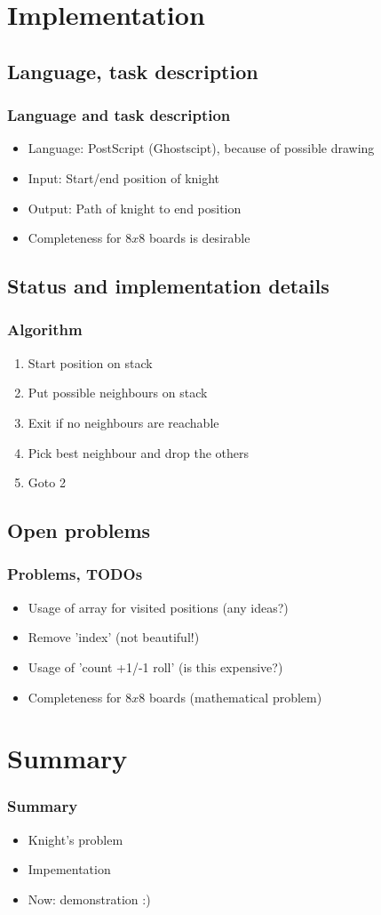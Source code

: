\documentclass{beamer}
\begin{document}
\section{Implementation}
\subsection{Language, task description}
\begin{frame}
\frametitle{Language and task description}
\begin{itemize}
	\item Language: PostScript (Ghostscipt), because of possible drawing
	\item Input: Start/end position of knight
	\item Output: Path of knight to end position
	\item Completeness for $8 x 8$ boards is desirable
\end{itemize}
\end{frame}

\subsection{Status and implementation details}
\begin{frame}
\frametitle{Algorithm}
\begin{enumerate}
	\item Start position on stack
	\item Put possible neighbours on stack
	\item Exit if no neighbours are reachable
	\item Pick best neighbour and drop the others
	\item Goto 2
\end{enumerate}
\end{frame}

\subsection{Open problems}
\begin{frame}
\frametitle{Problems, TODOs}
\begin{itemize}
	\item Usage of array for visited positions (any ideas?)
	\item Remove 'index' (not beautiful!)
	\item Usage of 'count +1/-1 roll' (is this expensive?)
	\item Completeness for $8 x 8$ boards (mathematical problem)
\end{itemize}
\end{frame}

\section{Summary}
\begin{frame}
\frametitle{Summary}
\begin{itemize}
	\item Knight's problem
	\item Impementation
	\item Now: demonstration :)
\end{itemize}
\end{frame}
\end{document}

